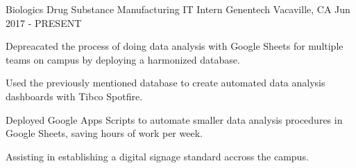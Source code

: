 

\begin{cventries}

  \cventry
    {Biologics Drug Substance Manufacturing IT Intern} %
    {Genentech} %
    {Vacaville, CA} %
    {Jun 2017 - PRESENT} %
    {
      \begin{cvitems} %
        \item {Depreacated the process of doing data analysis with Google Sheets for multiple teams on campus by deploying a harmonized database.}
        \item {Used the previously mentioned database to create automated data analysis dashboards with Tibco Spotfire.}
        \item {Deployed Google Apps Scripts to automate smaller data analysis procedures in Google Sheets, saving hours of work per week.}
        \item {Assisting in establishing a digital signage standard accross the campus.}
      \end{cvitems}
    }
\end{cventries}
